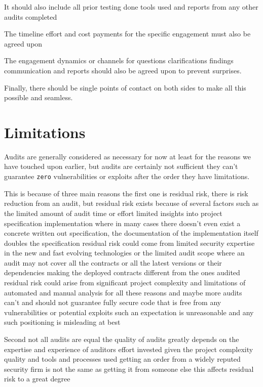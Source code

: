 It should also include all prior testing done tools used and reports from any other audits completed 

The timeline effort and cost payments for the specific engagement must also be agreed upon

The engagement dynamics or channels for questions clarifications findings communication and reports should also be agreed upon to prevent surprises. 

Finally, there should be single points of contact on both sides to make all this possible and seamless.

\section{Limitations}

Audits are generally considered as necessary for now at least for the reasons we have touched upon earlier, but audits are certainly not sufficient they can't guarantee \verb|zero| vulnerabilities or exploits after the order they have limitations.

This is because of three main reasons the first one is residual risk, there is risk reduction from an audit, but residual risk exists because of several factors such as the limited amount of audit time or effort limited insights into project specification implementation where in many cases there doesn't even exist a concrete written out specification, the documentation of the implementation itself doubles the specification residual risk could come from limited security expertise in the new and fast evolving technologies or the limited audit scope where an audit may not cover all the contracts or all the latest versions or their dependencies making the deployed contracts different from the ones audited residual risk could arise from significant project complexity and limitations of automated and manual analysis for all these reasons and maybe more audits can't and should not guarantee fully secure code that is free from any vulnerabilities or potential exploits such an expectation is unreasonable and any such positioning is misleading at best 

Second not all audits are equal the quality of audits greatly depends on the expertise and experience of auditors effort invested given the project complexity quality and tools and processes used getting an order from a widely reputed security firm is not the same as getting it from someone else this affects residual risk to a great degree

